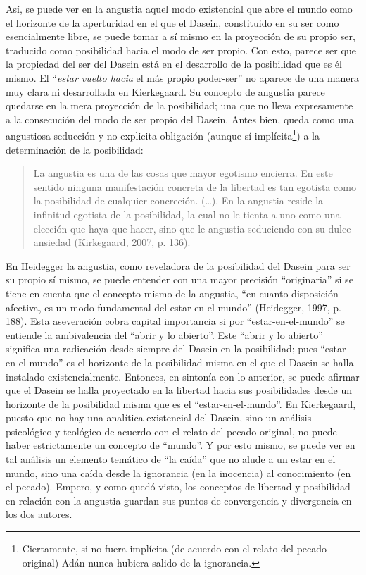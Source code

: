 \documentclass[]{article}
\begin{document}
Así, se puede ver en la angustia aquel modo existencial que abre el mundo como el horizonte de la aperturidad en el que el Dasein, constituido en su ser como esencialmente libre, se puede tomar a sí mismo en la proyección de su propio ser, traducido como posibilidad hacia el modo de ser propio. Con esto, parece ser que la propiedad del ser del Dasein está en el desarrollo de la posibilidad que es él mismo. El ``\emph{estar vuelto hacia} el más propio poder-ser'' no aparece de una manera muy clara ni desarrollada en Kierkegaard. Su concepto de angustia parece quedarse en la mera proyección de la posibilidad; una que no lleva expresamente a la consecución del modo de ser propio del Dasein. Antes bien, queda como una angustiosa seducción y no explicita obligación (aunque sí implícita\footnote{Ciertamente, si no fuera implícita (de acuerdo con el relato del pecado original) Adán nunca hubiera salido de la ignorancia.}) a la determinación de la posibilidad:

\begin{quote}
La angustia es una de las cosas que mayor egotismo encierra. En este sentido ninguna manifestación concreta de la libertad es tan egotista como la posibilidad de cualquier concreción. (\ldots{}). En la angustia reside la infinitud egotista de la posibilidad, la cual no le tienta a uno como una elección que haya que hacer, sino que le angustia seduciendo con su dulce ansiedad (Kirkegaard, 2007, p. 136).
\end{quote}

En Heidegger la angustia, como reveladora de la posibilidad del Dasein para ser su propio sí mismo, se puede entender con una mayor precisión ``originaria'' si se tiene en cuenta que el concepto mismo de la angustia, ``en cuanto disposición afectiva, es un modo fundamental del estar-en-el-mundo'' (Heidegger, 1997, p. 188). Esta aseveración cobra capital importancia si por ``estar-en-el-mundo'' se entiende la ambivalencia del ``abrir y lo abierto''. Este ``abrir y lo abierto'' significa una radicación desde siempre del Dasein en la posibilidad; pues ``estar-en-el-mundo'' es el horizonte de la posibilidad misma en el que el Dasein se halla instalado existencialmente. Entonces, en sintonía con lo anterior, se puede afirmar que el Dasein se halla proyectado en la libertad hacia sus posibilidades desde un horizonte de la posibilidad misma que es el ``estar-en-el-mundo''. En Kierkegaard, puesto que no hay una analítica existencial del Dasein, sino un análisis psicológico y teológico de acuerdo con el relato del pecado original, no puede haber estrictamente un concepto de ``mundo''. Y por esto mismo, se puede ver en tal análisis un elemento temático de ``la caída'' que no alude a un estar en el mundo, sino una caída desde la ignorancia (en la inocencia) al conocimiento (en el pecado). Empero, y como quedó visto, los conceptos de libertad y posibilidad en relación con la angustia guardan sus puntos de convergencia y divergencia en los dos autores.
\end{document}
